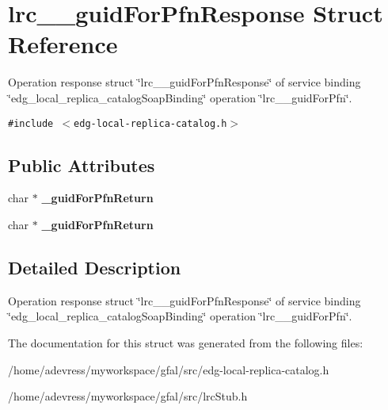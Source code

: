 \section{lrc\_\-\_\-guid\-For\-Pfn\-Response Struct Reference}
\label{structlrc____guidForPfnResponse}
Operation response struct \char`\"{}lrc\_\-\_\-guid\-For\-Pfn\-Response\char`\"{} of service binding \char`\"{}edg\_\-local\_\-replica\_\-catalog\-Soap\-Binding\char`\"{} operation \char`\"{}lrc\_\-\_\-guid\-For\-Pfn\char`\"{}.  


{\tt \#include $<$edg-local-replica-catalog.h$>$}

\subsection*{Public Attributes}
\begin{CompactItemize}
\item 
char $\ast$ \textbf{\_\-guid\-For\-Pfn\-Return}\label{structlrc____guidForPfnResponse_60110924bd2cd9f0a21c249ff2bc6bbf}

\item 
char $\ast$ \textbf{\_\-guid\-For\-Pfn\-Return}\label{structlrc____guidForPfnResponse_60110924bd2cd9f0a21c249ff2bc6bbf}

\end{CompactItemize}


\subsection{Detailed Description}
Operation response struct \char`\"{}lrc\_\-\_\-guid\-For\-Pfn\-Response\char`\"{} of service binding \char`\"{}edg\_\-local\_\-replica\_\-catalog\-Soap\-Binding\char`\"{} operation \char`\"{}lrc\_\-\_\-guid\-For\-Pfn\char`\"{}. 



The documentation for this struct was generated from the following files:\begin{CompactItemize}
\item 
/home/adevress/myworkspace/gfal/src/edg-local-replica-catalog.h\item 
/home/adevress/myworkspace/gfal/src/lrc\-Stub.h\end{CompactItemize}
